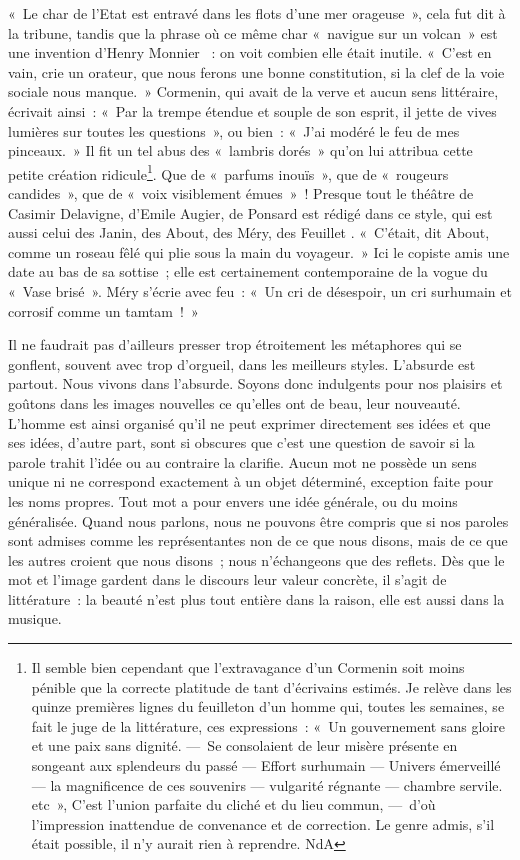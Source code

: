 \documentclass[french,twoside]{book} %
\begin{document}
« Le char de l’Etat est entravé dans les flots d’une mer orageuse », cela fut dit à la tribune, tandis que la phrase où ce même char « navigue sur un volcan » est une invention d’Henry Monnier  : on voit combien elle était inutile. « C’est en vain, crie un orateur, que nous ferons une bonne constitution, si la clef de la voie sociale nous manque. » Cormenin, qui avait de la verve et aucun sens littéraire, écrivait ainsi : « Par la trempe étendue et souple de son esprit, il jette de vives lumières sur toutes les questions », ou bien : « J’ai modéré le feu de mes pinceaux. » Il fit un tel abus des « lambris dorés » qu’on lui attribua cette petite création ridicule\footnote{Il semble bien cependant que l’extravagance d’un Cormenin soit moins pénible que la correcte platitude de tant d’écrivains estimés. Je relève dans les quinze premières lignes du feuilleton d’un homme qui, toutes les semaines, se fait le juge de la littérature, ces expressions : « Un gouvernement sans gloire et une paix sans dignité. — Se consolaient de leur misère présente en songeant aux splendeurs du passé — Effort surhumain — Univers émerveillé — la magnificence de ces souvenirs — vulgarité régnante — chambre servile. etc », C’est l’union parfaite du cliché et du lieu commun, — d’où l’impression inattendue de convenance et de correction. Le genre admis, s’il était possible, il n’y aurait rien à reprendre. NdA}. Que de « parfums inouïs », que de « rougeurs candides », que de « voix visiblement émues » ! Presque tout le théâtre de Casimir Delavigne, d’Emile Augier, de Ponsard est rédigé dans ce style, qui est aussi celui des Janin, des About, des Méry, des Feuillet . « C’était, dit About, comme un roseau fêlé qui plie sous la main du voyageur. » Ici le copiste amis une date au bas de sa sottise ; elle est certainement contemporaine de la vogue du « Vase brisé ». Méry s’écrie avec feu : « Un cri de désespoir, un cri surhumain et corrosif comme un tamtam ! »\par
Il ne faudrait pas d’ailleurs presser trop étroitement les métaphores qui se gonflent, souvent avec trop d’orgueil, dans les meilleurs styles. L’absurde est partout. Nous vivons dans l’absurde. Soyons donc indulgents pour nos plaisirs et goûtons dans les images nouvelles ce qu’elles ont de beau, leur nouveauté. L’homme est ainsi organisé qu’il ne peut exprimer directement ses idées et que ses idées, d’autre part, sont si obscures que c’est une question de savoir si la parole trahit l’idée ou au contraire la clarifie. Aucun mot ne possède un sens unique ni ne correspond exactement à un objet déterminé, exception faite pour les noms propres. Tout mot a pour envers une idée générale, ou du moins généralisée. Quand nous parlons, nous ne pouvons être compris que si nos paroles sont admises comme les représentantes non de ce que nous disons, mais de ce que les autres croient que nous disons ; nous n’échangeons que des reflets. Dès que le mot et l’image gardent dans le discours leur valeur concrète, il s’agit de littérature : la beauté n’est plus tout entière dans la raison, elle est aussi dans la musique.\par
\end{document}
